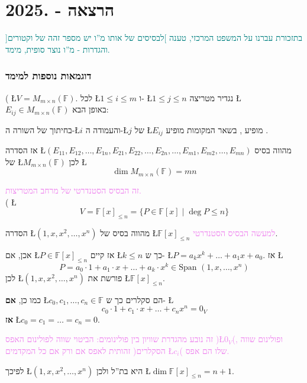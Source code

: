 \documentclass[english,hebrew]{article}
\newcommand{\spn}{\text{Span }}
\begin{document}
\part{הרצאה {\endL} - {.2025\endL}}

\textcolor{teal}{בתזכורת עברנו על המשפט המרכזי, טענה {]}לבסיסים של
אותו מ\textquotedblright ו יש מספר זהה של וקטורים{[} והגדרות - מ\textquotedblright ו
נוצר סופית, מימד. }

\section{דוגמאות נוספות למימד}

{\endL}( \L{$V=M_{m\times n}(\mathbb{F})$}. לכל \L{$1\leq i\leq m$}
ו- \L{$1\leq j\leq n$} נגדיר מטריצה \L{$E_{ij}\in M_{m\times n}(\mathbb{F})$}
באופן הבא:

בחיתוך של השורה ה-\L{$i$} והעמודה ה-\L{$j$} של \L{$E_{ij}$} מופיע
{\endL}, בשאר המקומות מופיע {\endL}.

אז הסדרה \L{$(E_{11},E_{12},\dots,E_{1n},E_{21},E_{22},\dots,E_{2n},\dots,E_{m1},E_{m2},\dots,E_{mn})$}
מהווה בסיס של \L{$M_{m\times n}(\mathbb{F})$} לכן \L{%
\[
\dim M_{m\times n}(\mathbb{F})=mn
\]
}%

\textcolor{violet}{זה הבסיס הסטנדרטי של מרחב המטריצות.}\\

{\endL}( \L{%
\[
V=\mathbb{F}[x]_{\le n}=\{P\in\mathbb{F}[x]\mid\deg P\le n\}
\]
}%

הסדרה \L{$(1,x,x^{2},\dots,x^{n})$} מהווה בסיס של \L{$\mathbb{F}[x]_{\le n}$}
\textcolor{violet}{למעשה} \textcolor{violet}{הבסיס הסטנדרטי}.

אכן, אם \L{$P\in\mathbb{F}[x]_{\le n}$} אז קיים \L{$k\le n$} כך
ש- \L{$P=a_{k}x^{k}+\dots+a_{1}x+a_{0}$}. אז \L{%
\[
P=a_{0}\cdot1+a_{1}\cdot x+\dots+a_{k}\cdot x^{k}\in\spn(1,x,\dots,x^{n})
\]
}%
לכן \L{$(1,x,x^{2},\dots,x^{n})$} פורשת את \L{$\mathbb{F}[x]_{\le n}$}.

כמו כן, \textbf{אם} \L{$c_{0},c_{1},\dots,c_{n}\in\mathbb{F}$} הם
סקלרים כך ש- \L{%
\[
c_{0}\cdot1+c_{1}\cdot x+\dots+c_{n}x^{n}=0_{V}
\]
}%
\textbf{אז} \L{$c_{0}=c_{1}=\dots=c_{n}=0$}. 

\textcolor{violet}{זה נובע מהגדרת שוויון בין פולינומים: הביטוי שווה
לפולינום האפס )\L{$0_{V}$}(, ופולינום שווה זהותית לאפס אם ורק אם
כל המקדמים )הסקלרים \L{$c_{i}$}( שלו הם אפס.}

לפיכך \L{$(1,x,x^{2},\dots,x^{n})$} היא בת\textquotedblright ל ולכן
\L{$\dim\mathbb{F}[x]_{\le n}=n+1$}.
\end{document}
